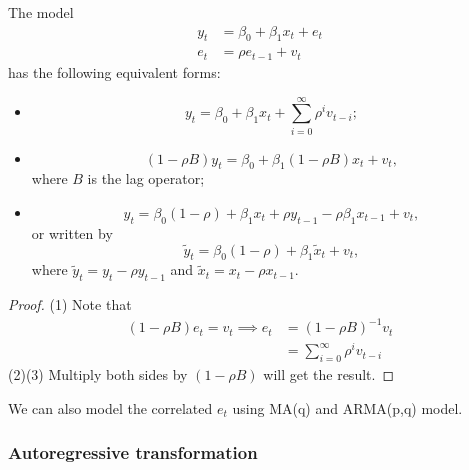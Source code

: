 \begin{refsection}
\begin{remark}

\end{remark}


\begin{lemma}\cite[361]{hill2010principles}\label{ch:regression-analysis:th:equivalentFormAR(1)NoiseModel}
The model 	
\begin{align*}
y_t &= \beta_0 + \beta_1 x_t + e_t \\
e_t & = \rho e_{t-1} + v_t
\end{align*}
has the following equivalent forms:
\begin{itemize}
	\item $$y_t = \beta_0 + \beta_1 x_t + \sum_{i=0}^\infty \rho^i v_{t-i};$$
	\item $$(1 - \rho B)y_t = \beta_0 + \beta_1(1 - \rho B) x_t  + v_t,$$
	where $B$ is the lag operator;
	\item $$y_t = \beta_0(1 - \rho) + \beta_1 x_t + \rho y_{t-1} - \rho \beta_1 x_{t-1} + v_t,$$
	or written by
	$$\tilde{y}_t = \beta_0(1 - \rho) + \beta_1 \tilde{x}_t  + v_t,$$
	where $\tilde{y}_t = y_t  - \rho y_{t-1}$ and $\tilde{x}_t = x_t - \rho x_{t-1}$. 
\end{itemize} 
\end{lemma}
\begin{proof}
	(1) Note that 
\begin{align*}
	(1 - \rho B) e_t= v_t \implies e_t  &=(1 - \rho B)^{-1} v_t \\
	& =  \sum_{i=0}^\infty \rho^i v_{t-i}
\end{align*}
(2)(3) Multiply both sides by $(1 - \rho B)$ will get the result.	
\end{proof}


\begin{remark}
We can also model the correlated $e_t$ using MA(q) and ARMA(p,q) model.	
\end{remark}


\subsubsection{Autoregressive transformation}

\begin{lemma}\cite[254]{theil1971principles}


\end{lemma}
\end{refsection}
